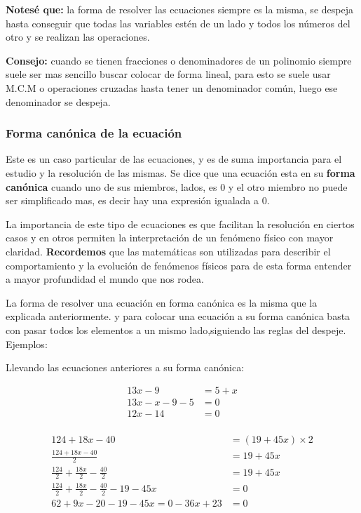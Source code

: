 \documentclass[12pt]{article}
\begin{document}
    \textbf{Notesé que: }la forma de resolver las ecuaciones siempre es la misma,
    se despeja hasta conseguir que todas las variables estén de un lado y todos
    los números del otro y se realizan las operaciones.

    \textbf{Consejo: } cuando se tienen fracciones o denominadores de un polinomio
    siempre suele ser mas sencillo buscar colocar de forma lineal, para esto se
    suele usar M.C.M o operaciones cruzadas hasta tener un denominador común,
    luego ese denominador se despeja.


\subsubsection{Forma canónica de la ecuación}
    Este es un caso particular de las ecuaciones, y es de suma importancia para
    el estudio y la resolución de las mismas. Se dice que una ecuación esta en
    su \textbf{forma canónica} cuando uno de sus miembros, lados, es 0 y el otro
    miembro no puede ser simplificado mas, es decir
    hay una expresión igualada a 0.

    La importancia de este tipo de ecuaciones es que facilitan la resolución en
    ciertos casos y en otros permiten la interpretación de un fenómeno físico con
    mayor claridad. \textbf{Recordemos} que las matemáticas son utilizadas para
    describir el comportamiento y la evolución de fenómenos físicos para de esta
    forma entender a mayor profundidad el mundo que nos rodea.

    La forma de resolver una ecuación en forma canónica es la misma que la
    explicada anteriormente. y para colocar una ecuación a su forma canónica basta
    con pasar todos los elementos a un mismo lado,siguiendo las reglas del despeje.
    Ejemplos:

    Llevando las ecuaciones anteriores a su forma canónica:

    \begin{align*}
        13x - 9 &= 5 + x		\\
        13x -x -9 -5 &= 0\\
        12x -14 &= 0 \\
    \end{align*}

    \begin{align*}
        124 + 18x -40 &= (19+45x)\times2 		\\
        \frac{124+18x-40}{2}&= 19 + 45x\\
        \frac{124}{2} +\frac{18x}{2} - \frac{40}{2}  &= 19 +45x\\
        \frac{124}{2} +\frac{18x}{2} - \frac{40}{2} -19 -45x  &=0\\
        62+9x-20-19-45x=0
        -36x+23 &= 0\\
    \end{align*}
\end{document}
